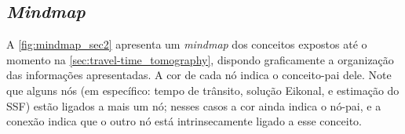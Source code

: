 \subsection{\textsl{Mindmap}}

A \cref{fig:mindmap_sec2} apresenta um \textsl{mindmap} dos conceitos expostos até o momento na \cref{sec:travel-time_tomography}, dispondo graficamente a organização das informações apresentadas. A cor de cada nó indica o conceito-pai dele. Note que alguns nós (em específico: tempo de trânsito, solução Eikonal, e estimação do SSF) estão ligados a mais um nó; nesses casos a cor ainda indica o nó-pai, e a conexão indica que o outro nó está intrinsecamente ligado a esse conceito.



%
%
%

